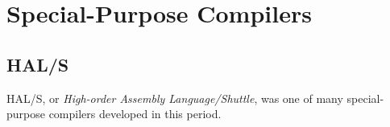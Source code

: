 \section{Special-Purpose Compilers}

\subsection{HAL/S}

HAL/S, or \textit{High-order Assembly Language/Shuttle}, was one of many special-purpose
compilers developed in this period.
